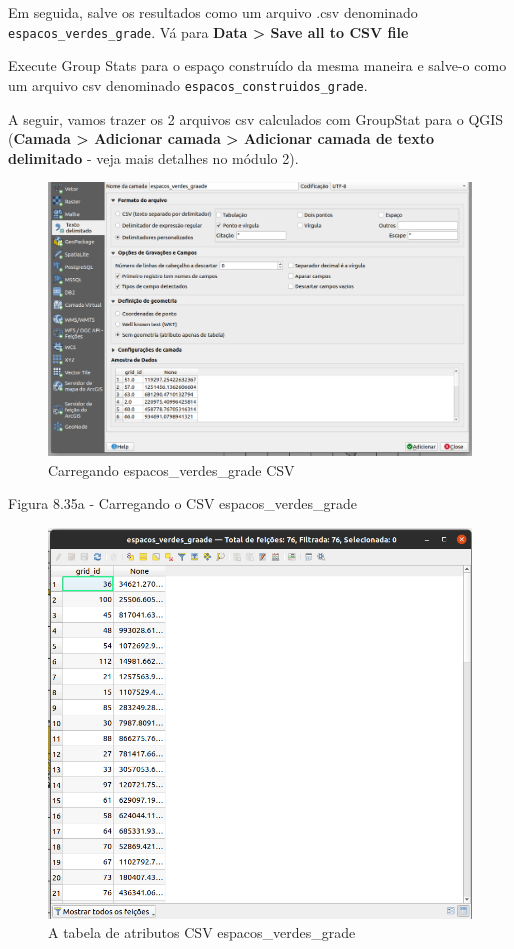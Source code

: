 \documentclass[
  portuguese,
]{krantz}
\begin{document}
Em seguida, salve os resultados como um arquivo .csv denominado \texttt{espacos\_verdes\_grade}. Vá para \textbf{Data \textgreater{} Save all to CSV file}

Execute Group Stats para o espaço construído da mesma maneira e salve-o como um arquivo csv denominado \texttt{espacos\_construidos\_grade}.

A seguir, vamos trazer os 2 arquivos csv calculados com GroupStat para o QGIS (\textbf{Camada \textgreater{} Adicionar camada \textgreater{} Adicionar camada de texto delimitado} - veja mais detalhes no módulo 2).

\begin{figure}
\centering
\includegraphics{media/modulo8/fig835_a.png}
\caption{Carregando espacos\_verdes\_grade CSV}
\end{figure}

Figura 8.35a - Carregando o CSV espacos\_verdes\_grade

\begin{figure}
\centering
\includegraphics{media/modulo8/fig835_b.png}
\caption{A tabela de atributos CSV espacos\_verdes\_grade}
\end{figure}
\end{document}
